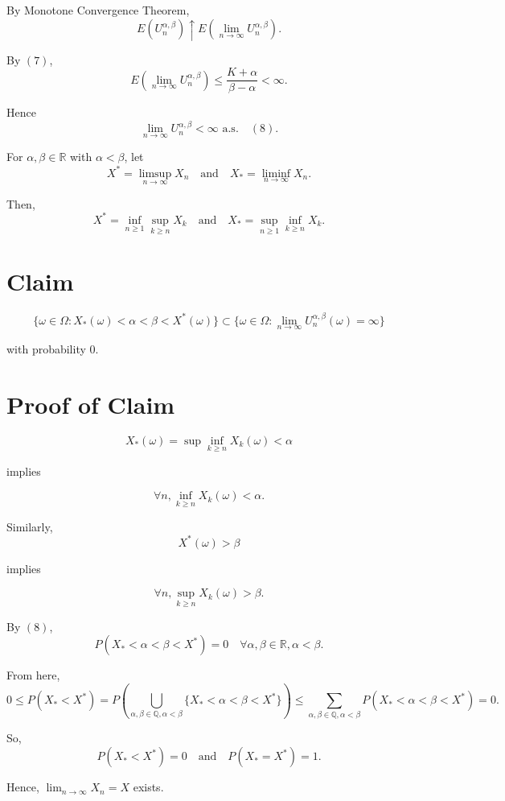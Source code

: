 By Monotone Convergence Theorem,
\[ E(U_n^{\alpha, \beta}) \uparrow E(\lim_{n \to \infty} U_n^{\alpha, \beta}). \]

By $(7)$,
\[ E(\lim_{n \to \infty} U_n^{\alpha, \beta}) \leq \frac{K + \alpha}{\beta - \alpha} < \infty. \]

Hence
\[ \lim_{n \to \infty} U_n^{\alpha, \beta} < \infty \text{ a.s.} \quad (8). \]

For $\alpha, \beta \in \mathbb{R}$ with $\alpha < \beta$, let
\[ X^* = \limsup_{n \to \infty} X_n \quad \text{and} \quad X_* = \liminf_{n \to \infty} X_n. \]

Then,
\[ X^* = \inf_{n \geq 1} \sup_{k \geq n} X_k \quad \text{and} \quad X_* = \sup_{n \geq 1} \inf_{k \geq n} X_k. \]

\section*{Claim}
\[ \{ \omega \in \Omega : X_*(\omega) < \alpha < \beta < X^*(\omega) \} \subset \{ \omega \in \Omega : \lim_{n \to \infty} U_n^{\alpha, \beta}(\omega) = \infty \} \]

with probability $0$.

\section*{Proof of Claim}
\[ X_*(\omega) = \sup \inf_{k \geq n} X_k(\omega) < \alpha \]

implies

\[ \forall n, \inf_{k \geq n} X_k(\omega) < \alpha. \]

Similarly,
\[ X^*(\omega) > \beta \]

implies

\[ \forall n, \sup_{k \geq n} X_k(\omega) > \beta. \]

By $(8)$,
\[ P(X_* < \alpha < \beta < X^*) = 0 \quad \forall \alpha, \beta \in \mathbb{R}, \alpha < \beta. \]

From here,
\[ 0 \leq P(X_* < X^*) = P\left( \bigcup_{\alpha, \beta \in \mathbb{Q}, \alpha < \beta} \{X_* < \alpha < \beta < X^*\} \right) \leq \sum_{\alpha, \beta \in \mathbb{Q}, \alpha < \beta} P(X_* < \alpha < \beta < X^*) = 0. \]

So,
\[ P(X_* < X^*) = 0 \quad \text{and} \quad P(X_* = X^*) = 1. \]

Hence, $\lim_{n \to \infty} X_n = X$ exists.